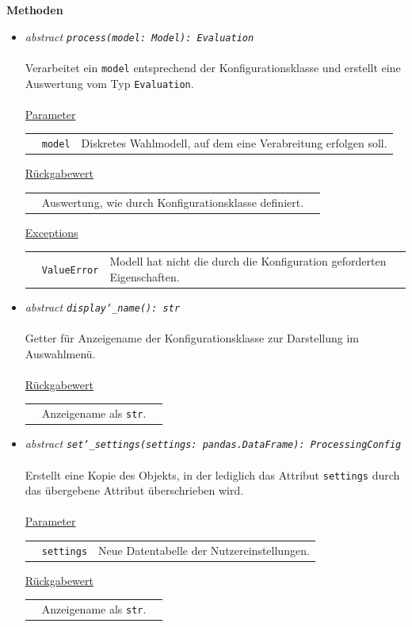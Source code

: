 \documentclass{article}
\begin{document}
\textbf{Methoden}
\begin{itemize}\setlength\itemsep{3em}
\item \textit{\flqq{}abstract\frqq} \texttt{\textit{process(model: Model): Evaluation}}\\\\
Verarbeitet ein \texttt{model} entsprechend der Konfigurationsklasse und erstellt eine Auswertung vom Typ \texttt{Evaluation}.
\\\\
\underline{Parameter}\\
\begin{tabular}{lll}
 & \texttt{model} & Diskretes Wahlmodell, auf dem eine Verabreitung erfolgen soll.\\
\end{tabular}

\underline{Rückgabewert}\\
\begin{tabular}{lll}
 & Auswertung, wie durch Konfigurationsklasse definiert.\\
\end{tabular}

\underline{Exceptions}\\
\begin{tabular}{lll}
 & \texttt{ValueError} & Modell hat nicht die durch die Konfiguration geforderten Eigenschaften.\\
\end{tabular}

\item \textit{\flqq{}abstract\frqq} \texttt{\textit{display\char`_name(): str}}\\\\
Getter für Anzeigename der Konfigurationsklasse zur Darstellung im Auswahlmenü.
\\\\
\underline{Rückgabewert}\\
\begin{tabular}{lll}
 & Anzeigename als \texttt{str}.\\
\end{tabular}

\item \textit{\flqq{}abstract\frqq} \texttt{\textit{set\char`_settings(settings: pandas.DataFrame): ProcessingConfig}}\\\\
Erstellt eine Kopie des Objekts, in der lediglich das Attribut \texttt{settings} durch das übergebene Attribut überschrieben wird.
\\\\
\underline{Parameter}\\
\begin{tabular}{lll}
 & \texttt{settings} & Neue Datentabelle der Nutzereinstellungen.\\
\end{tabular}

\underline{Rückgabewert}\\
\begin{tabular}{lll}
 & Anzeigename als \texttt{str}.\\
\end{tabular}
\end{itemize}
\end{document}
